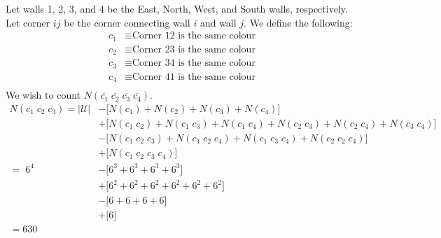 \documentclass{article}
\begin{document}
\section{} %
Let walls 1, 2, 3, and 4 be the East, North, West, and South walls,
respectively. Let corner $ij$ be the corner connecting wall $i$ and wall $j$.
\newline
\newline
We define the following:
\begin{align*}
	c_1&\equiv\text{Corner 12 is the same colour}\\
	c_2&\equiv\text{Corner 23 is the same colour}\\
	c_3&\equiv\text{Corner 34 is the same colour}\\
	c_4&\equiv\text{Corner 41 is the same colour}\\
\end{align*}
We wish to count
$N(\overline{c_1}\;\overline{c_2}\;\overline{c_3}\;\overline{c_4})$.
\begin{align*}
	N(\overline{c_1}\;\overline{c_2}\;\overline{c_3})=
	|\mathcal{U}|
	&-\big[N(c_1)+N(c_2)+N(c_3)+N(c_4)\big]\\
	&+\big[N(c_1\;c_2)+N(c_1\;c_3)+N(c_1\;c_4)+N(c_2\;c_3)+N(c_2\;c_4)+N(c_3\;c_4)\big]\\
	&-\big[N(c_1\;c_2\;c_3)+N(c_1\;c_2\;c_4)+N(c_1\;c_3\;c_4)+N(c_2\;c_2\;c_4)\big]\\
	&+\big[N(c_1\;c_2\;c_3\;c_4)\big]\\
	=\;6^4
	&-\big[6^3+6^3+6^3+6^3\big]\\
	&+\big[6^2+6^2+6^2+6^2+6^2+6^2\big]\\
	&-\big[6+6+6+6\big]\\
	&+\big[6\big]\\
	=630
\end{align*}
\end{document}

